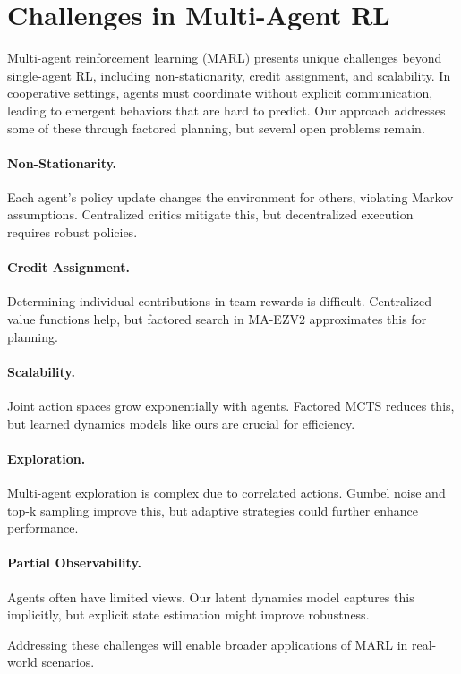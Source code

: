 \documentclass[10pt]{article}
\begin{document}
\section{Challenges in Multi-Agent RL}
Multi-agent reinforcement learning (MARL) presents unique challenges beyond single-agent RL, including non-stationarity, credit assignment, and scalability. In cooperative settings, agents must coordinate without explicit communication, leading to emergent behaviors that are hard to predict. Our approach addresses some of these through factored planning, but several open problems remain.

\paragraph{Non-Stationarity.} Each agent's policy update changes the environment for others, violating Markov assumptions. Centralized critics mitigate this, but decentralized execution requires robust policies.

\paragraph{Credit Assignment.} Determining individual contributions in team rewards is difficult. Centralized value functions help, but factored search in MA-EZV2 approximates this for planning.

\paragraph{Scalability.} Joint action spaces grow exponentially with agents. Factored MCTS reduces this, but learned dynamics models like ours are crucial for efficiency.

\paragraph{Exploration.} Multi-agent exploration is complex due to correlated actions. Gumbel noise and top-k sampling improve this, but adaptive strategies could further enhance performance.

\paragraph{Partial Observability.} Agents often have limited views. Our latent dynamics model captures this implicitly, but explicit state estimation might improve robustness.

Addressing these challenges will enable broader applications of MARL in real-world scenarios.
\end{document}
